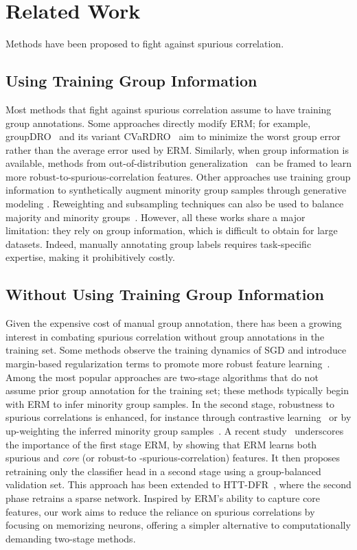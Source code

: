 \section{Related Work}
\label{sec:related_work}
Methods have been proposed to fight against spurious correlation. 

\subsection{Using Training Group Information} Most methods that fight against spurious correlation assume to have training group annotations. Some approaches directly modify ERM; for example, groupDRO~\citep{sagawa2019distributionally} and its variant CVaRDRO~\citep{duchi2021learning} aim to minimize the worst group error rather than the average error used by ERM. Similarly, when group information is available, methods from out-of-distribution generalization~\citep{arjovsky2019invariant,krueger2021out,wald2021calibration,krueger2021out} can be framed to learn more robust-to-spurious-correlation features. Other approaches use training group information to synthetically augment minority group samples through generative modeling \citep{goel2020model}. Reweighting and subsampling techniques can also be used to balance majority and minority groups~\citep{sagawa2020investigation,byrd2019effect}. However, all these works share a major limitation:  they rely on group information, which is difficult to obtain for large datasets. Indeed, manually annotating group labels requires task-specific expertise, making it prohibitively costly.

\subsection{Without Using Training Group Information} Given the expensive cost of manual group annotation, there has been a growing interest in combating spurious correlation without group annotations in the training set. Some methods observe the training dynamics of SGD and introduce margin-based regularization terms to promote more robust feature learning~\citep{pezeshki2021gradient, puli2023don}. Among the most popular approaches are two-stage algorithms that do not assume prior group annotation for the training set; these methods typically begin with ERM to infer minority group samples. In the second stage, robustness to spurious correlations is enhanced, for instance through contrastive learning~\citep{zhang2022correct} or by up-weighting the inferred minority group samples~\citep{qiu2023simple, liu2021just}. A recent study~\citep{kirichenko2022last} underscores the importance of the first stage ERM, by showing that ERM learns both spurious and \textit{core} (or robust-to -spurious-correlation) features. It then proposes retraining only the classifier head in a second stage using a group-balanced validation set. This approach has been extended to HTT-DFR~\citep{hameed2024not}, where the second phase retrains a sparse network. Inspired by ERM’s ability to capture core features, our work aims to reduce the reliance on spurious correlations by focusing on memorizing neurons, offering a simpler alternative to computationally demanding two-stage methods.

